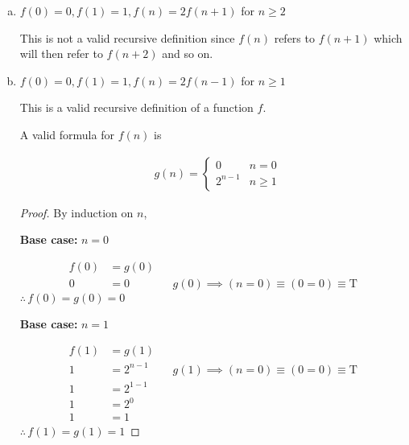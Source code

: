 \documentclass{homework}
\begin{document}
\begin{problem}{2}
\begin{enumerate}[(a)]
\begin{proof}
\textbf{Inductive step:} Suppose $f(n) = g(n)$ for $n > 1 \text{ and } (n \bmod 3) \neq 1$, we will show that:

\begin{align*}
f(n) &= g(n) && \text{for } n > 1 \text{ and } (n \bmod 3) \neq 1 \\
2f(n - 3) &= 2^{\left\lfloor (n-1)/3\right\rfloor +1} && \text{for } n > 1 \text{ and } (n \bmod 3) \neq 1
\end{align*}

Since,

\begin{align*}
2f(n - 3) &= 2^{\left\lfloor (n-1)/3\right\rfloor +1}
\end{align*}

$\therefore \, f(n) = g(n)$ for $n > 1 \text{ and } (n \bmod 3) \neq 1$.
\end{proof}



\item $f(0) = 0, f(1) = 1, f(n) = 2f(n + 1)$ for $n \geq 2$

This is not a valid recursive definition since $f(n)$ refers to $f(n + 1)$ which will then refer to $f(n + 2)$ and so on.



\item $f(0) = 0, f(1) = 1, f(n) = 2f(n - 1)$ for $n \geq 1$

This is a valid recursive definition of a function $f$.

A valid formula for $f(n)$ is 

\begin{align*}
& g(n) =
  \begin{cases}
    0 & n = 0 \\
    2^{n-1} & n \geq 1
  \end{cases}
\end{align*}

\begin{proof}
By induction on $n$,

\textbf{Base case:} $n = 0$

\begin{align*}
f(0) &= g(0) \\
0 &= 0 && g(0) \implies (n = 0) \equiv (0 = 0) \equiv \text{T} 
\end{align*}
$\therefore \, f(0) = g(0) = 0$

\textbf{Base case:} $n = 1$

\begin{align*}
f(1) &= g(1) \\
1 &= 2^{n-1} && g(1) \implies (n = 0) \equiv (0 = 0) \equiv \text{T} \\
1 &= 2^{1-1} \\
1 &= 2^{0} \\
1 &= 1
\end{align*}
$\therefore \, f(1) = g(1) = 1$


\end{proof}
\end{enumerate}
\end{problem}
\end{document}
